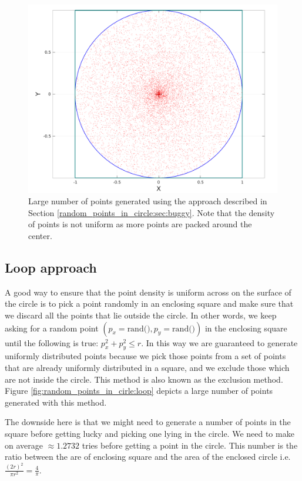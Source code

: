 \begin{figure}
	\label{fig:random_points_in_cirle:buggy}
	\centering
	\includegraphics[scale=0.3]{sources/random_points_in_circle/images/buggy_points}
	\caption{Large number of points generated using the approach described in Section \ref{random_points_in_circle:sec:buggy}. Note that the density of points is not uniform as more points are packed around the center.}
\end{figure}

\subsection{Loop approach}
\label{random_points_in_circle:sec:loop}
A good way to ensure that the point density is uniform across on the surface of the circle is to pick a point randomly in an enclosing square and make sure that we discard all the points that lie outside the circle. In other words, we keep asking for a random point $(p_x=\text{rand()}, p_y=\text{rand()})$ in the enclosing square until the following is true: $p_x^2 + p_y^2 \leq r$. In this way we are guaranteed to generate uniformly distributed points because we pick those points from a set of points that are already uniformly distributed in a square, and we exclude those which are not inside the circle. This method is also known as the exclusion method. Figure \ref{fig:random_points_in_cirle:loop} depicts a large number of points generated with this method.

The downside here is that we might need to generate a number of points in the square before getting lucky and picking one lying in the circle. We need to make on average $\approx 1.2732$ tries before getting a point in the circle. This number is  the ratio between the are of enclosing square and the area of the enclosed circle i.e. $\frac{(2r)^2}{\pi r^2} = \frac{4}{\pi}$. 

